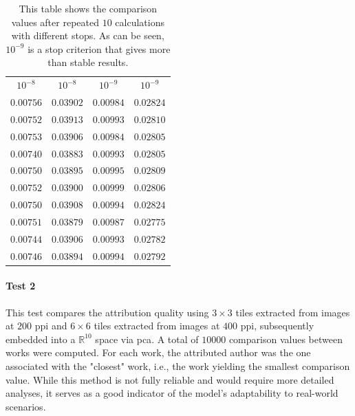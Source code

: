 \begin{toReview}
	\begin{table}[H]
		\centering
		\begin{tabular}{|c|c|c|c|}
			\hline
			\rowcolor{ambra}
			\multicolumn{4}{|c|}{stop criteria} \\
			\hline
			\rowcolor{lavender}
			$10^{-8}$ & $10^{-8}$ & $10^{-9}$ & $10^{-9}$ \\
			\hline
			$0.00756$ & $0.03902$ & $0.00984$ & $0.02824$ \\
			\hline
			$0.00752$ & $0.03913$ & $0.00993$ & $0.02810$ \\
			\hline
			$0.00753$ & $0.03906$ & $0.00984$ & $0.02805$ \\
			\hline
			$0.00740$ & $0.03883$ & $0.00993$ & $0.02805$ \\
			\hline
			$0.00750$ & $0.03895$ & $0.00995$ & $0.02809$ \\
			\hline
			$0.00752$ & $0.03900$ & $0.00999$ & $0.02806$ \\
			\hline
			$0.00750$ & $0.03908$ & $0.00994$ & $0.02824$ \\
			\hline
			$0.00751$ & $0.03879$ & $0.00987$ & $0.02775$ \\
			\hline
			$0.00744$ & $0.03906$ & $0.00993$ & $0.02782$ \\
			\hline
			$0.00746$ & $0.03894$ & $0.00994$ & $0.02792$ \\
			\hline
		\end{tabular}
		\caption[Stability of comparison algorithm]{This table shows the comparison values after repeated $10$ calculations with different stops. As can be seen, $10^{-9}$ is a stop criterion that gives more than stable results.}
		\label{tab:distStability_tuning}
	\end{table}

	\paragraph{Test 2}
	This test compares the attribution quality using $3\times3$ tiles extracted from images at $200$ \gls{ppi} and $6\times6$ tiles extracted from images at $400$ \gls{ppi}, subsequently embedded into a $\mathbb{R}^{10}$ space via \gls{pca}. A total of $\num{10000}$ comparison values between works were computed. For each work, the attributed author was the one associated with the "closest" work, i.e., the work yielding the smallest comparison value. While this method is not fully reliable and would require more detailed analyses, it serves as a good indicator of the model's adaptability to real-world scenarios.


\end{toReview}
